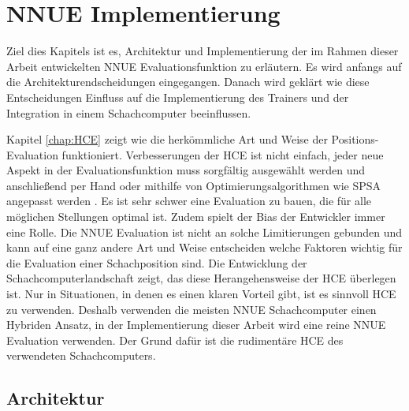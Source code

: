 \chapter{NNUE Implementierung}

Ziel dies Kapitels ist es, Architektur und Implementierung der im Rahmen dieser Arbeit entwickelten \ac{NNUE} Evaluationsfunktion zu erläutern. Es wird anfangs auf die Architekturendscheidungen eingegangen. Danach wird geklärt wie diese Entscheidungen Einfluss auf die Implementierung des Trainers und der Integration in einem Schachcomputer beeinflussen.

Kapitel \autoref{chap:HCE} zeigt wie die herkömmliche Art und Weise der Positions-Evaluation funktioniert. Verbesserungen der \ac{HCE} ist nicht einfach, jeder neue Aspekt in der Evaluationsfunktion muss sorgfältig ausgewählt werden und anschließend per Hand oder mithilfe von Optimierungsalgorithmen wie \zb{} \ac{SPSA} angepasst werden \cite{spall1992multivariate}. Es ist sehr schwer eine Evaluation zu bauen, die für alle möglichen Stellungen optimal ist. Zudem spielt der Bias der Entwickler immer eine Rolle. Die \ac{NNUE} Evaluation ist nicht an solche Limitierungen gebunden und kann auf eine ganz andere Art und Weise entscheiden welche Faktoren wichtig für die Evaluation einer Schachposition sind. Die Entwicklung der Schachcomputerlandschaft zeigt, das diese Herangehensweise der \ac{HCE} überlegen ist. Nur in Situationen, in denen es einen klaren Vorteil gibt, ist es sinnvoll \ac{HCE} zu verwenden. Deshalb verwenden die meisten \ac{NNUE} Schachcomputer einen Hybriden Ansatz, in der Implementierung dieser Arbeit wird eine reine \ac{NNUE} Evaluation verwenden. Der Grund dafür ist die rudimentäre \ac{HCE} des verwendeten Schachcomputers.


\section{Architektur}

